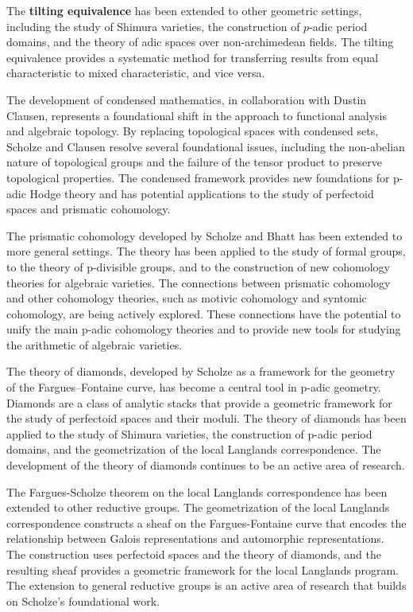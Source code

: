 The \textbf{tilting equivalence} has been extended to other geometric settings, including the study of Shimura varieties, the construction of $p$-adic period domains, and the theory of adic spaces over non-archimedean fields. The tilting equivalence provides a systematic method for transferring results from equal characteristic to mixed characteristic, and vice versa.

The development of condensed mathematics, in collaboration with Dustin Clausen, represents a foundational shift in the approach to functional analysis and algebraic topology. By replacing topological spaces with condensed sets, Scholze and Clausen resolve several foundational issues, including the non-abelian nature of topological groups and the failure of the tensor product to preserve topological properties. The condensed framework provides new foundations for p-adic Hodge theory and has potential applications to the study of perfectoid spaces and prismatic cohomology.

The prismatic cohomology developed by Scholze and Bhatt has been extended to more general settings. The theory has been applied to the study of formal groups, to the theory of p-divisible groups, and to the construction of new cohomology theories for algebraic varieties. The connections between prismatic cohomology and other cohomology theories, such as motivic cohomology and syntomic cohomology, are being actively explored. These connections have the potential to unify the main p-adic cohomology theories and to provide new tools for studying the arithmetic of algebraic varieties.

The theory of diamonds, developed by Scholze as a framework for the geometry of the Fargues--Fontaine curve, has become a central tool in p-adic geometry. Diamonds are a class of analytic stacks that provide a geometric framework for the study of perfectoid spaces and their moduli. The theory of diamonds has been applied to the study of Shimura varieties, the construction of p-adic period domains, and the geometrization of the local Langlands correspondence. The development of the theory of diamonds continues to be an active area of research.

The Fargues-Scholze theorem on the local Langlands correspondence has been extended to other reductive groups. The geometrization of the local Langlands correspondence constructs a sheaf on the Fargues-Fontaine curve that encodes the relationship between Galois representations and automorphic representations. The construction uses perfectoid spaces and the theory of diamonds, and the resulting sheaf provides a geometric framework for the local Langlands program. The extension to general reductive groups is an active area of research that builds on Scholze's foundational work.

